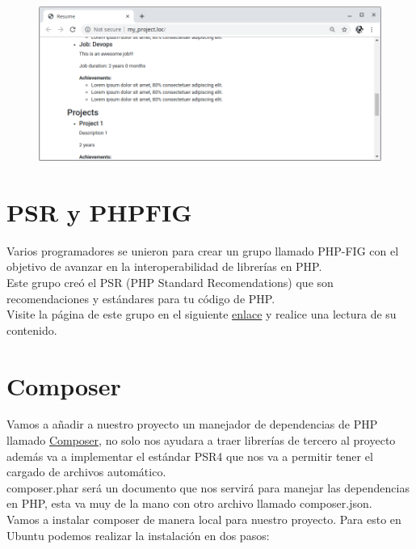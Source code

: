 \documentclass{article}
\begin{document}
\begin{figure}[h!]
  \centering
  \includegraphics[scale=0.5]{./Pictures/054_namespaces.png}
\end{figure}


\section{PSR y PHPFIG}%
Varios programadores se unieron para crear un grupo llamado PHP-FIG con el
objetivo de avanzar en la interoperabilidad de librerías en PHP.\\

Este grupo creó el PSR (PHP Standard Recomendations) que son recomendaciones y
estándares para tu código de PHP.\\

Visite la página de este grupo en el siguiente
\href{https://www.php-fig.org/psr/}{enlace} y realice una lectura de su
contenido.\\

\newpage

\section{Composer}%
Vamos a añadir a nuestro proyecto un manejador de dependencias de PHP llamado
\href{https://getcomposer.org}{Composer}, no solo nos ayudara a traer librerías
de tercero al proyecto además va a implementar el estándar PSR4 que nos va a
permitir tener el cargado de archivos automático.\\

composer.phar será un documento que nos servirá para manejar las dependencias
en PHP, esta va muy de la mano con otro archivo llamado composer.json.\\

Vamos a instalar composer de manera local para nuestro proyecto. Para esto en
Ubuntu podemos realizar la instalación en dos pasos:\\
\end{document}
